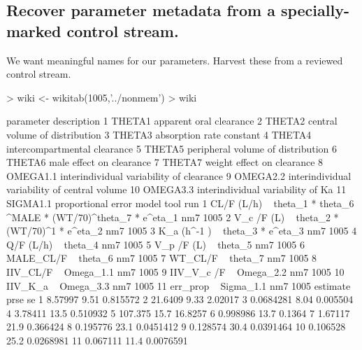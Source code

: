 \subsection{Recover parameter metadata from a specially-marked control stream.}
We want meaningful names for our parameters.  Harvest these from a reviewed control
stream.
\begin{Schunk}
\begin{Sinput}
> wiki <- wikitab(1005,'../nonmem')
> wiki
\end{Sinput}
\begin{Soutput}
   parameter                                   description
1     THETA1                       apparent oral clearance
2     THETA2                central volume of distribution
3     THETA3                      absorption rate constant
4     THETA4                  intercompartmental clearance
5     THETA5             peripheral volume of distribution
6     THETA6                      male effect on clearance
7     THETA7                    weight effect on clearance
8   OMEGA1.1      interindividual variability of clearance
9   OMEGA2.2 interindividual variability of central volume
10  OMEGA3.3             interindividual variability of Ka
11  SIGMA1.1                            proportional error
                                                                model tool  run
1  CL/F (L/h) ~ theta_1 *  theta_6 ^MALE * (WT/70)^theta_7  * e^eta_1  nm7 1005
2                          V_c /F (L) ~ theta_2 * (WT/70)^1 * e^eta_2  nm7 1005
3                                     K_a (h^-1 ) ~ theta_3 * e^eta_3  nm7 1005
4                                                 Q/F (L/h) ~ theta_4  nm7 1005
5                                                V_p /F (L) ~ theta_5  nm7 1005
6                                                 MALE_CL/F ~ theta_6  nm7 1005
7                                                   WT_CL/F ~ theta_7  nm7 1005
8                                                IIV_CL/F ~ Omega_1.1  nm7 1005
9                                              IIV_V_c /F ~ Omega_2.2  nm7 1005
10                                               IIV_K_a  ~ Omega_3.3  nm7 1005
11                                               err_prop ~ Sigma_1.1  nm7 1005
    estimate prse        se
1    8.57997 9.51  0.815572
2    21.6409 9.33   2.02017
3  0.0684281 8.04  0.005504
4    3.78411 13.5  0.510932
5    107.375 15.7   16.8257
6   0.998986 13.7    0.1364
7    1.67117 21.9  0.366424
8   0.195776 23.1 0.0451412
9   0.128574 30.4 0.0391464
10  0.106528 25.2 0.0268981
11  0.067111 11.4 0.0076591
\end{Soutput}

\end{Schunk}
